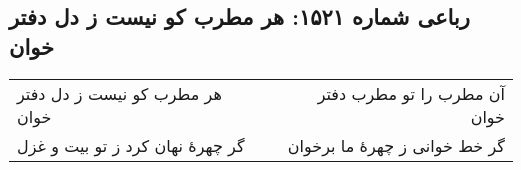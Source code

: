 \begin{center}
\section*{رباعی شماره ۱۵۲۱: هر مطرب کو نیست ز دل دفتر خوان}
\label{sec:1521}
\begin{longtable}{l p{0.5cm} r}
هر مطرب کو نیست ز دل دفتر خوان
&&
آن مطرب را تو مطرب دفتر خوان
\\
گر چهرهٔ نهان کرد ز تو بیت و غزل
&&
گر خط خوانی ز چهرهٔ ما برخوان
\\
\end{longtable}
\end{center}

